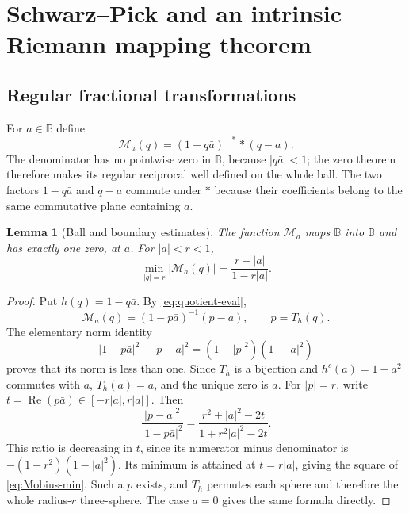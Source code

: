 \documentclass[11pt,a4paper]{article}
\numberwithin{equation}{section}
\newtheorem{lemma}[theorem]{Lemma}
\theoremstyle{definition}
\theoremstyle{remark}
\newcommand{\BB}{\mathbb B}
\newcommand{\Rea}{\operatorname{Re}}
\begin{document}
\section{Schwarz--Pick and an intrinsic Riemann mapping theorem}
\label{sec:geometry}
\subsection{Regular fractional transformations}
For $a\in\BB$ define
\begin{equation}
 \mathcal M_a(q)=(1-q\bar a)^{-*}*(q-a).
 \label{eq:Mobius}
\end{equation}
The denominator has no pointwise zero in $\BB$, because $|q\bar a|<1$;
the zero theorem therefore makes its regular reciprocal well defined on the
whole ball. The two factors $1-q\bar a$ and $q-a$ commute under $*$ because
their coefficients belong to the same commutative plane containing $a$.

\begin{lemma}[Ball and boundary estimates]
\label{lem:Mobius}
The function $\mathcal M_a$ maps $\BB$ into $\BB$ and has exactly one zero,
at $a$. For $|a|<r<1$,
\begin{equation}
 \min_{|q|=r}|\mathcal M_a(q)|
 =\frac{r-|a|}{1-r|a|}.
 \label{eq:Mobius-min}
\end{equation}
\end{lemma}
\begin{proof}
Put $h(q)=1-q\bar a$. By \eqref{eq:quotient-eval},
\[
 \mathcal M_a(q)=(1-p\bar a)^{-1}(p-a),\qquad p=T_h(q).
\]
The elementary norm identity
\begin{equation}
 |1-p\bar a|^2-|p-a|^2=(1-|p|^2)(1-|a|^2)
 \label{eq:ballidentity}
\end{equation}
proves that its norm is less than one. Since $T_h$ is a bijection and
$h^c(a)=1-a^2$ commutes with $a$, $T_h(a)=a$, and the unique zero is $a$.
For $|p|=r$, write $t=\Rea(p\bar a)\in[-r|a|,r|a|]$. Then
\[
 \frac{|p-a|^2}{|1-p\bar a|^2}
 =\frac{r^2+|a|^2-2t}{1+r^2|a|^2-2t}.
\]
This ratio is decreasing in $t$, since its numerator minus denominator is
$-(1-r^2)(1-|a|^2)$. Its minimum is attained at $t=r|a|$, giving the square
of \eqref{eq:Mobius-min}. Such a $p$ exists, and $T_h$ permutes each sphere
and therefore the whole radius-$r$ three-sphere. The case $a=0$ gives the
same formula directly.
\end{proof}
\end{document}
